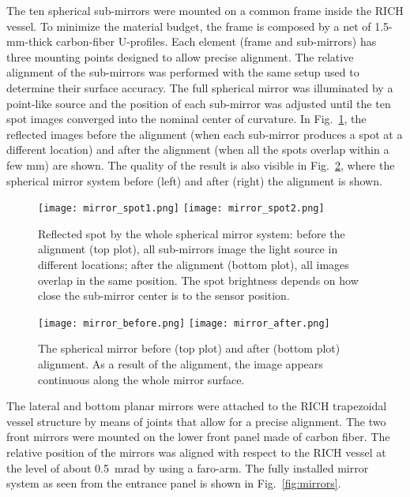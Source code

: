 \documentclass[5p,times,twocolumn]{elsarticle}
\begin{document}
The ten spherical sub-mirrors were mounted on a common frame inside the RICH vessel. To
minimize the material budget, the frame is composed by a net of 1.5-mm-thick carbon-fiber U-profiles. Each element
(frame and sub-mirrors) has three mounting points designed to allow precise alignment. The relative alignment of
the sub-mirrors was performed with the same setup used to determine their surface accuracy. The full spherical
mirror was illuminated by a point-like source and the position of each sub-mirror was adjusted until the ten spot images
converged into the nominal center of curvature. In Fig.~\ref{fig:MirSpots}, the reflected images before the alignment
(when each sub-mirror produces a spot at a different location) and after the alignment (when all the spots overlap
within a few mm) are shown. The quality of the result is also visible in Fig.~\ref{fig:MirAlign}, where the spherical
mirror system before (left) and after (right) the alignment is shown.

\begin{figure}
\begin{center}
\texttt{[image: mirror\_spot1.png]}
\texttt{[image: mirror\_spot2.png]}
\caption{Reflected spot by the whole spherical mirror system: before the alignment (top plot), all sub-mirrors
  image the light source in different locations; after the alignment (bottom plot), all images overlap in the same
  position. The spot brightness depends on how close the sub-mirror center is to the sensor position.}
\label{fig:MirSpots}
\end{center}
\end{figure}

\begin{figure}
\begin{center}
\texttt{[image: mirror\_before.png]}
\texttt{[image: mirror\_after.png]}
\caption{The spherical mirror before (top plot) and after (bottom plot) alignment. As a result of the alignment, the image
  appears continuous along the whole mirror surface.}
\label{fig:MirAlign}
\end{center}
\end{figure}

The lateral and bottom planar mirrors were attached to the RICH trapezoidal vessel structure by means of
joints that allow for a precise alignment. The two front mirrors
were mounted on the lower front panel made of carbon fiber. The relative position of the mirrors was
aligned with respect to the RICH vessel at the level of about 0.5~mrad by using a faro-arm. The fully installed
mirror system as seen from the entrance panel is shown in Fig.~\ref{fig:mirrors}.
\end{document}
